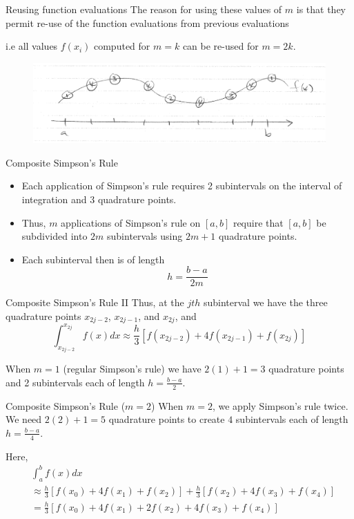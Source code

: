 \documentclass[12pt]{beamer}
\begin{document}
\begin{frame}{Reusing function evaluations} 
The reason for using these values of $m$ is that they permit re-use of the function evaluations from previous evaluations

 i.e all values $f(x_i)$ computed for $m=k$ can be re-used for $m=2k$. 


\begin{figure}[h] 
  \centering
  \includegraphics[scale=0.4]{reuse_of_points}
  \label{fig:reuse}
\end{figure}

\end{frame} 

\begin{frame}{Composite Simpson's Rule}
\begin{itemize}
\item{Each application of Simpson's rule requires 2 subintervals on the interval of integration and 3 quadrature points.}
\item{Thus, $m$ applications of Simpson's rule on $[a,b]$ require that $[a,b]$ be subdivided into $2m$ subintervals using $2m+1$ quadrature points.}
\item{Each subinterval then is of length
\[
h=\frac{b-a}{2m}
\]}
\end{itemize}
\vspace{2 in}
\end{frame}

\begin{frame}{Composite Simpson's Rule II}
Thus, at the $jth$ subinterval we have the three quadrature points $x_{2j-2}$, $x_{2j-1}$, and $x_{2j}$, and
\[
\int_{x_{2j-2}}^{x_{2j}} f(x)dx \approx \frac{h}{3} \left [ f(x_{2j-2}) + 4f(x_{2j-1}) + f(x_{2j}) \right ] 
\]			     

When $m=1$ (regular Simpson's rule) we have $2(1)+1=3$ quadrature points and 2 subintervals each of length $h=\frac{b-a}{2}$.
\vspace{2 in}
\end{frame}

\begin{frame}{Composite Simpson's Rule ($m=2$)}
When $m=2$, we apply Simpson's rule twice. We need $2(2)+1=5$ quadrature points to create $4$ subintervals each of length $h=\frac{b-a}{4}$.

\vspace{0.9 in}
Here,
\begin{align*} 
& \int_{a}^{b} f(x)dx \\
& \approx \frac{h}{3} \left [ f(x_0) + 4f(x_1) + f(x_2) \right ] + \frac{h}{3} \left [ f(x_2) + 4f(x_3) + f(x_4) \right ] \\
& = \frac{h}{3} \left [ f(x_0) + 4f(x_1) + 2f(x_2) + 4f(x_3) + f(x_4) \right ]
\end{align*} 


\end{frame}
\end{document}
